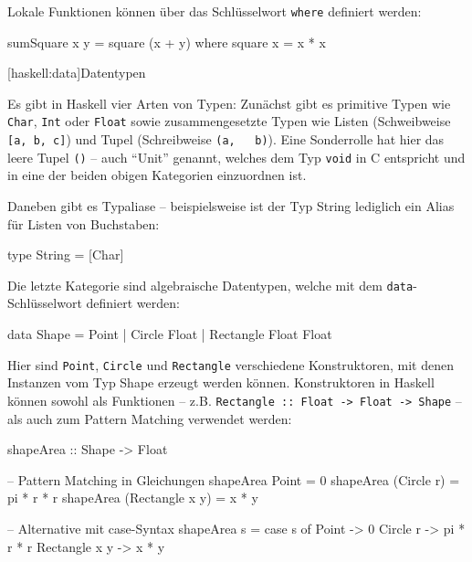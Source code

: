 \documentclass[12pt, a4paper, bibgerm]{scrbook}
\newenvironment{DIFnomarkup}{}{}
\newcommand\icode[1]{\lstinline?#1?}
\newcommand\lsection{}
\begin{document}
Lokale Funktionen können über das Schlüsselwort \icode{where} definiert
werden:
\begin{DIFnomarkup}\begin{code}
sumSquare x y = square (x + y)
  where
    square x = x * x
\end{code}\end{DIFnomarkup}

\lsection[haskell:data]{Datentypen}

Es gibt in Haskell vier Arten von Typen: Zunächst gibt es primitive
Typen wie \icode{Char}, \icode{Int} oder \icode{Float} sowie
zusammengesetzte Typen wie Listen (Schweibweise \icode{[a, b, c]}) und Tupel (Schreibweise \icode{(a,
  b)}). Eine Sonderrolle hat hier das leere Tupel \icode{()} -- auch
"`Unit"' genannt, welches dem Typ \icode{void} in C entspricht und in
eine der beiden obigen Kategorien einzuordnen ist.

Daneben gibt es Typaliase -- beispielsweise ist der Typ String lediglich
ein Alias für Listen von Buchstaben:
\begin{DIFnomarkup}\begin{code}
type String = [Char]
\end{code}\end{DIFnomarkup}

Die letzte Kategorie sind algebraische Datentypen, welche mit dem
\icode{data}-Schlüsselwort definiert werden:
\begin{DIFnomarkup}\begin{code}
data Shape = Point
           | Circle Float
           | Rectangle Float Float
\end{code}\end{DIFnomarkup}
Hier sind \icode{Point}, \icode{Circle} und \icode{Rectangle}
verschiedene Konstruktoren, mit denen Instanzen vom Typ Shape erzeugt
werden können. Konstruktoren in Haskell können sowohl als Funktionen --
z.B. \icode{Rectangle :: Float -> Float -> Shape} -- als auch zum Pattern
Matching verwendet werden:
\begin{DIFnomarkup}\begin{code}
shapeArea :: Shape -> Float

-- Pattern Matching in Gleichungen
shapeArea Point           = 0
shapeArea (Circle r)      = pi * r * r
shapeArea (Rectangle x y) = x * y

-- Alternative mit case-Syntax
shapeArea s = case s of
                Point         -> 0
                Circle r      -> pi * r * r
                Rectangle x y -> x * y
\end{code}\end{DIFnomarkup}
\end{document}
